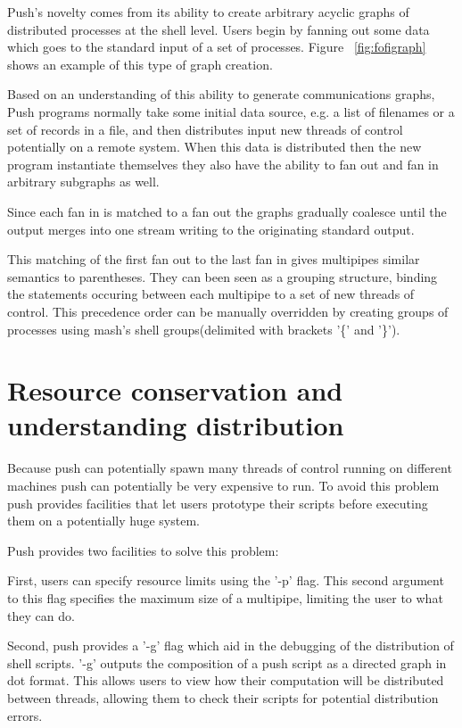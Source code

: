 \documentclass[10pt,conference,letterpaper]{IEEEtran}
\begin{document}
Push's novelty comes from its ability to create arbitrary acyclic graphs of distributed processes at the shell level. Users begin by fanning out some data which goes to the standard input of a set of processes. Figure ~\ref{fig:fofigraph} shows an example of this type of graph creation.

Based on an understanding of this ability to generate communications graphs, Push programs normally take some initial data source, e.g. a list of filenames or a set of records in a file, and then distributes input new threads of control potentially on a remote system.  When this data is distributed then the new program instantiate themselves they also have the ability to fan out and fan in arbitrary subgraphs as well. 

Since each fan in is matched to a fan out the graphs gradually coalesce until the output merges into one stream writing to the originating standard output. 

This matching of the first fan out to the last fan in gives multipipes similar semantics to parentheses. They can been seen as a grouping structure, binding the statements occuring between each multipipe to a set of new threads of control. This precedence order can be manually overridden by creating groups of processes using mash's shell groups(delimited with brackets '\{' and '\}').
\section{Resource conservation and understanding distribution}

Because push can potentially spawn many threads of control running on different machines push can potentially be very expensive to run. To avoid this problem push provides facilities that let users prototype their scripts before executing them on a potentially huge system. 

Push provides two facilities to solve this problem:

First, users can specify resource limits using the '-p' flag. This second argument to this flag specifies the maximum size of a multipipe, limiting the user to what they can do.

Second,  push provides a '-g' flag which aid in the debugging of the distribution of shell scripts. '-g' outputs the composition of a push script as a directed graph in dot\cite{koutsofios1999dgd} format. This allows users to view how their computation will be distributed between threads, allowing them to check their scripts for potential distribution errors. 
\end{document}
